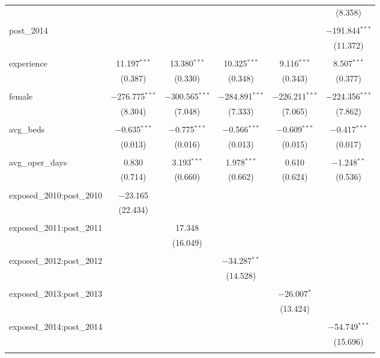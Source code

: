 \begin{table}[!htbp]
\begin{tabular}{@{\extracolsep{5pt}}lccccc}
  &  &  &  &  & (8.358) \\ 
  & & & & & \\ 
 post\_2014 &  &  &  &  & $-$191.844$^{***}$ \\ 
  &  &  &  &  & (11.372) \\ 
  & & & & & \\ 
 experience & 11.197$^{***}$ & 13.380$^{***}$ & 10.325$^{***}$ & 9.116$^{***}$ & 8.507$^{***}$ \\ 
  & (0.387) & (0.330) & (0.348) & (0.343) & (0.377) \\ 
  & & & & & \\ 
 female & $-$276.775$^{***}$ & $-$300.565$^{***}$ & $-$284.891$^{***}$ & $-$226.211$^{***}$ & $-$224.356$^{***}$ \\ 
  & (8.304) & (7.048) & (7.333) & (7.065) & (7.862) \\ 
  & & & & & \\ 
 avg\_beds & $-$0.635$^{***}$ & $-$0.775$^{***}$ & $-$0.566$^{***}$ & $-$0.609$^{***}$ & $-$0.417$^{***}$ \\ 
  & (0.013) & (0.016) & (0.013) & (0.015) & (0.017) \\ 
  & & & & & \\ 
 avg\_oper\_days & 0.830 & 3.193$^{***}$ & 1.978$^{***}$ & 0.610 & $-$1.248$^{**}$ \\ 
  & (0.714) & (0.660) & (0.662) & (0.624) & (0.536) \\ 
  & & & & & \\ 
 exposed\_2010:post\_2010 & $-$23.165 &  &  &  &  \\ 
  & (22.434) &  &  &  &  \\ 
  & & & & & \\ 
 exposed\_2011:post\_2011 &  & 17.348 &  &  &  \\ 
  &  & (16.049) &  &  &  \\ 
  & & & & & \\ 
 exposed\_2012:post\_2012 &  &  & $-$34.287$^{**}$ &  &  \\ 
  &  &  & (14.528) &  &  \\ 
  & & & & & \\ 
 exposed\_2013:post\_2013 &  &  &  & $-$26.007$^{*}$ &  \\ 
  &  &  &  & (13.424) &  \\ 
  & & & & & \\ 
 exposed\_2014:post\_2014 &  &  &  &  & $-$54.749$^{***}$ \\ 
  &  &  &  &  & (15.696) \\ 
  & & & & & \\ 

\end{tabular}
\end{table}
